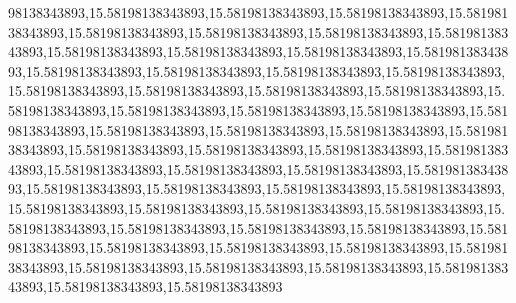 98138343893,15.58198138343893,15.58198138343893,15.58198138343893,15.58198138343893,15.58198138343893,15.58198138343893,15.58198138343893,15.58198138343893,15.58198138343893,15.58198138343893,15.58198138343893,15.58198138343893,15.58198138343893,15.58198138343893,15.58198138343893,15.58198138343893,15.58198138343893,15.58198138343893,15.58198138343893,15.58198138343893,15.58198138343893,15.58198138343893,15.58198138343893,15.58198138343893,15.58198138343893,15.58198138343893,15.58198138343893,15.58198138343893,15.58198138343893,15.58198138343893,15.58198138343893,15.58198138343893,15.58198138343893,15.58198138343893,15.58198138343893,15.58198138343893,15.58198138343893,15.58198138343893,15.58198138343893,15.58198138343893,15.58198138343893,15.58198138343893,15.58198138343893,15.58198138343893,15.58198138343893,15.58198138343893,15.58198138343893,15.58198138343893,15.58198138343893,15.58198138343893,15.58198138343893,15.58198138343893,15.58198138343893,15.58198138343893,15.58198138343893,15.58198138343893,15.58198138343893,15.58198138343893,15.58198138343893,15.58198138343893
